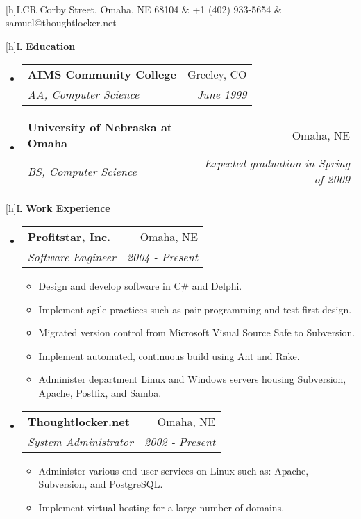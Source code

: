 \documentclass[letterpaper,11pt]{article}
\makeatletter
\newcommand{\resumesection}[1]{
  \setlength\extrarowheight{4pt}
  \begin{tabularx}{\linewidth}[h]{L}
    \hline\textbf{\Large #1}\\\hline
\end{tabularx}}
\newcommand{\resumeitemheading}[4]{
  \item
  \begin{tabular*}{6.5in}{l@{\extracolsep{\fill}}r}
    \textbf{#1} & #2 \\
    \textit{#3} & \textit{#4} \\
\end{tabular*}}
\newcommand{\employerheading}[4]{\resumeitemheading{#1}{#2}{#3}{#4}\vspace{-6pt}}
\newcommand{\responsibility}[1]{\item #1 \vspace{-2pt}}
\newcommand{\resumeheader}[4]{
  \raggedleft{\Huge #1}\\
  \begin{tabularx}{\linewidth}[h]{LCR}
    \hline #2 & #3 & #4 \\\hline
\end{tabularx}\vspace{0.1in}}
\makeatother
\begin{document}
\resumeheader{Samuel Tesla}
             {5844 Corby Street, Omaha, NE 68104}
             {+1 (402) 933-5654}
             {samuel@thoughtlocker.net}


\resumesection{Education}
\begin{itemize}
  \resumeitemheading{AIMS Community College}{Greeley, CO}
                {AA, Computer Science}{June 1999}
  \resumeitemheading{University of Nebraska at Omaha}{Omaha, NE}
                {BS, Computer Science}{Expected graduation in Spring of 2009}
\end{itemize}

\resumesection{Work Experience}
\begin{itemize}


  \employerheading{Profitstar, Inc.}{Omaha, NE}
  {Software Engineer }{2004 - Present}
  \begin{itemize}
    \responsibility{Design and develop software in C\# and Delphi.}
    \responsibility{Implement agile practices such as pair programming and test-first design.}
    \responsibility{Migrated version control from Microsoft Visual Source Safe to Subversion.}
    \responsibility{Implement automated, continuous build using Ant and Rake.}
    \responsibility{Administer department Linux and Windows servers housing Subversion, Apache,
      Postfix, and Samba.}
  \end{itemize}


  \employerheading{Thoughtlocker.net}{Omaha, NE}
  {System Administrator}{2002 - Present}
  \begin{itemize}
    \responsibility{Administer various end-user services on Linux such as: Apache,
      Subversion, and PostgreSQL.}
    \responsibility{Implement virtual hosting for a large number of domains.}
  \end{itemize}


\end{itemize}
\end{document}
